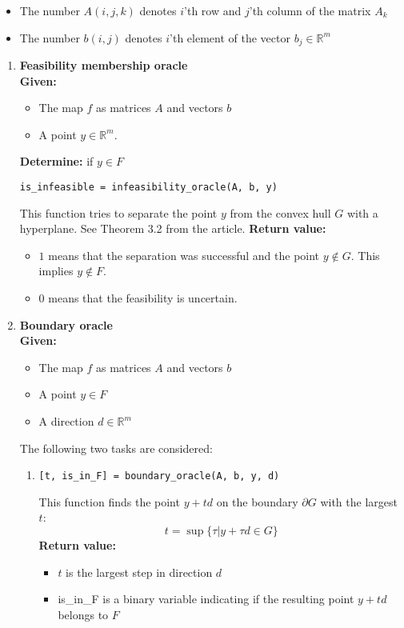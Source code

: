 \documentclass[a4paper]{article}
\newcommand{\R}{\mathbb{R}}
\theoremstyle{definition}
\begin{document}
\begin{itemize}
\item The number $A(i, j, k)$ denotes $i$'th row and $j$'th column of the matrix $A_k$
\item The number $b(i, j)$ denotes $i$'th element of the vector $b_j\in\mathbb{R}^m$
\end{itemize}

\begin{enumerate}
\item {\bf Feasibility membership oracle}\\
{\bf Given:}
\begin{itemize}
\item The map $f$ as matrices $A$ and vectors $b$
\item A point $y\in\mathbb{R}^m$.
\end{itemize}
{\bf Determine:} if $y\in F$
\begin{verbatim}
is_infeasible = infeasibility_oracle(A, b, y)
\end{verbatim}
This function tries to separate the point $y$ from the convex hull $G$ with a hyperplane. See Theorem 3.2 from the article.
{\bf Return value:}
\begin{itemize}
\item $1$ means that the separation was successful and the point $y\notin G$. This implies $y\notin F$.
\item $0$ means that the feasibility is uncertain.
\end{itemize}

\item {\bf Boundary oracle}\\
{\bf Given:}
\begin{itemize}
	\item The map $f$ as matrices $A$ and vectors $b$
	\item A point $y\in F$
	\item A direction $d\in\R^m$
\end{itemize}
The following two tasks are considered:
\begin{enumerate}
\item \begin{verbatim}
[t, is_in_F] = boundary_oracle(A, b, y, d)
\end{verbatim}
This function finds the point $y+td$ on the boundary $\partial G$ with the largest $t$:
$$t = \sup\{\tau\big| y+\tau d\in G\}$$
{\bf Return value:}
\begin{itemize}
	\item $t$ is the largest step in direction $d$
	\item is\_in\_F is a binary variable indicating if the resulting point $y+td$ belongs to $F$
\end{itemize}


\end{enumerate}
\end{enumerate}
\end{document}
